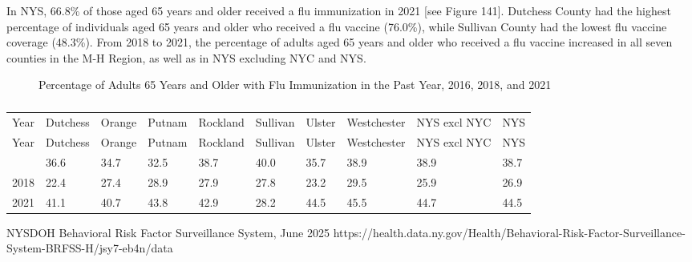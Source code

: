 \documentclass[
  english,
  letterpaper,
]{report}
\begin{document}
In NYS, 66.8\% of those aged 65 years and older received a flu
immunization in 2021 {[}see Figure 141{]}. Dutchess County had the
highest percentage of individuals aged 65 years and older who received a
flu vaccine (76.0\%), while Sullivan County had the lowest flu vaccine
coverage (48.3\%). From 2018 to 2021, the percentage of adults aged 65
years and older who received a flu vaccine increased in all seven
counties in the M-H Region, as well as in NYS excluding NYC and NYS.

\begin{figure}


\caption{\label{fig-65-flu-immi-percent}Percentage of Adults 65 Years
and Older with Flu Immunization in the Past Year, 2016, 2018, and 2021}

\end{figure}%

\begin{longtable}[]{@{}llllllllll@{}}

\caption{\label{tbl-65-flu-immi-percent}Percentage of Adults 65 Years
and Older with Flu Immunization in the Past Year, 2016, 2018, and 2021}

\tabularnewline

\caption{}\label{T_187e3}\tabularnewline
\toprule\noalign{}
Year & Dutchess & Orange & Putnam & Rockland & Sullivan & Ulster &
Westchester & NYS excl NYC & NYS \\
\midrule\noalign{}
\endfirsthead
\toprule\noalign{}
Year & Dutchess & Orange & Putnam & Rockland & Sullivan & Ulster &
Westchester & NYS excl NYC & NYS \\
\midrule\noalign{}
\endhead
\bottomrule\noalign{}
\endlastfoot
2016 & 36.6 & 34.7 & 32.5 & 38.7 & 40.0 & 35.7 & 38.9 & 38.9 & 38.7 \\
2018 & 22.4 & 27.4 & 28.9 & 27.9 & 27.8 & 23.2 & 29.5 & 25.9 & 26.9 \\
2021 & 41.1 & 40.7 & 43.8 & 42.9 & 28.2 & 44.5 & 45.5 & 44.7 & 44.5 \\

\end{longtable}

\begin{tcolorbox}[enhanced jigsaw, breakable, leftrule=.75mm, title=\textcolor{quarto-callout-note-color}{\faInfo}\hspace{0.5em}{Source}, bottomrule=.15mm, opacityback=0, left=2mm, colback=white, bottomtitle=1mm, coltitle=black, colbacktitle=quarto-callout-note-color!10!white, colframe=quarto-callout-note-color-frame, opacitybacktitle=0.6, toptitle=1mm, titlerule=0mm, arc=.35mm, rightrule=.15mm, toprule=.15mm]

NYSDOH Behavioral Risk Factor Surveillance System, June 2025
https://health.data.ny.gov/Health/Behavioral-Risk-Factor-Surveillance-System-BRFSS-H/jsy7-eb4n/data

\end{tcolorbox}
\end{document}
